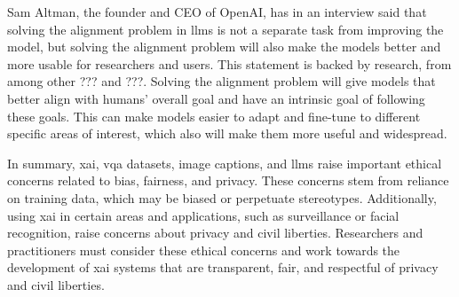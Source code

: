 

Sam Altman, the founder and CEO of OpenAI, has in an interview said that solving the alignment problem in \glspl{llm} is not a separate task from improving the model, but solving the alignment problem will also make the models better and more usable for researchers and users. This statement is backed by research, from among other ??? and ???. Solving the alignment problem will give models that better align with humans' overall goal and have an intrinsic goal of following these goals. This can make models easier to adapt and fine-tune to different specific areas of interest, which also will make them more useful and widespread. 










\begin{comment}
    Tell how this thesis uses the ethical information above when doing research.
\end{comment}

In summary, \gls{xai}, \gls{vqa} datasets, image captions, and \glspl{llm} raise important ethical concerns related to bias, fairness, and privacy. These concerns stem from reliance on training data, which may be biased or perpetuate stereotypes. Additionally, using \gls{xai} in certain areas and applications, such as surveillance or facial recognition, raise concerns about privacy and civil liberties. Researchers and practitioners must consider these ethical concerns and work towards the development of \gls{xai} systems that are transparent, fair, and respectful of privacy and civil liberties.